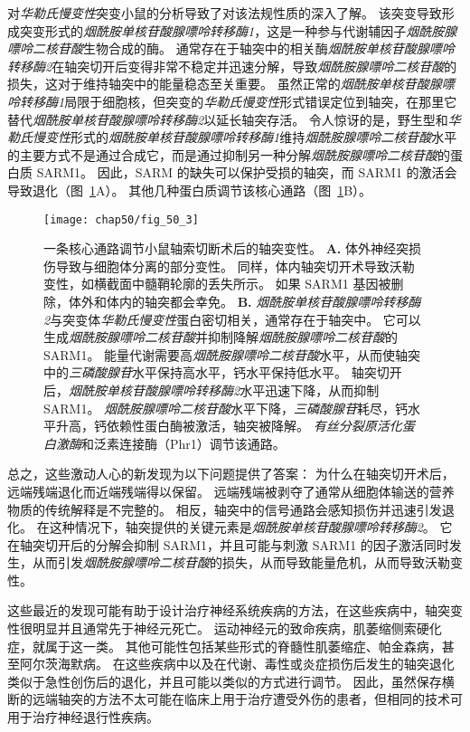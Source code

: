 对\textit{华勒氏慢变性}突变小鼠的分析导致了对该法规性质的深入了解。
该突变导致形成突变形式的\textit{烟酰胺单核苷酸腺嘌呤转移酶1}，这是一种参与代谢辅因子\textit{烟酰胺腺嘌呤二核苷酸}生物合成的酶。
通常存在于轴突中的相关酶\textit{烟酰胺单核苷酸腺嘌呤转移酶2}在轴突切开后变得非常不稳定并迅速分解，导致\textit{烟酰胺腺嘌呤二核苷酸}的损失，这对于维持轴突中的能量稳态至关重要。
虽然正常的\textit{烟酰胺单核苷酸腺嘌呤转移酶1}局限于细胞核，但突变的\textit{华勒氏慢变性}形式错误定位到轴突，在那里它替代\textit{烟酰胺单核苷酸腺嘌呤转移酶2}以延长轴突存活。
令人惊讶的是，野生型和\textit{华勒氏慢变性}形式的\textit{烟酰胺单核苷酸腺嘌呤转移酶1}维持\textit{烟酰胺腺嘌呤二核苷酸}水平的主要方式不是通过合成它，而是通过抑制另一种分解\textit{烟酰胺腺嘌呤二核苷酸}的蛋白质 SARM1。
因此，SARM 的缺失可以保护受损的轴突，而 SARM1 的激活会导致退化（图~\ref{fig:50_3}A）。
其他几种蛋白质调节该核心通路（图~\ref{fig:50_3}B）。


\begin{figure}[htbp]
	\centering
	\texttt{[image: chap50/fig\_50\_3]}
	\caption{一条核心通路调节小鼠轴索切断术后的轴突变性。
		\textbf{A.} 体外神经突损伤导致与细胞体分离的部分变性。
		同样，体内轴突切开术导致沃勒变性，如横截面中髓鞘轮廓的丢失所示。
		如果 SARM1 基因被删除，体外和体内的轴突都会幸免。
		\textbf{B.} \textit{烟酰胺单核苷酸腺嘌呤转移酶2}与突变体\textit{华勒氏慢变性}蛋白密切相关，通常存在于轴突中。
		它可以生成\textit{烟酰胺腺嘌呤二核苷酸}并抑制降解\textit{烟酰胺腺嘌呤二核苷酸}的 SARM1。
		能量代谢需要高\textit{烟酰胺腺嘌呤二核苷酸}水平，从而使轴突中的\textit{三磷酸腺苷}水平保持高水平，钙水平保持低水平。
		轴突切开后，\textit{烟酰胺单核苷酸腺嘌呤转移酶2}水平迅速下降，从而抑制 SARM1。
		\textit{烟酰胺腺嘌呤二核苷酸}水平下降，\textit{三磷酸腺苷}耗尽，钙水平升高，钙依赖性蛋白酶被激活，轴突被降解。
		\textit{有丝分裂原活化蛋白激酶}和泛素连接酶（Phr1）调节该通路。}
	\label{fig:50_3}
\end{figure}


总之，这些激动人心的新发现为以下问题提供了答案：
为什么在轴突切开术后，远端残端退化而近端残端得以保留。
远端残端被剥夺了通常从细胞体输送的营养物质的传统解释是不完整的。
相反，轴突中的信号通路会感知损伤并迅速引发退化。
在这种情况下，轴突提供的关键元素是\textit{烟酰胺单核苷酸腺嘌呤转移酶2}。
它在轴突切开后的分解会抑制 SARM1，并且可能与刺激 SARM1 的因子激活同时发生，从而引发\textit{烟酰胺腺嘌呤二核苷酸}的损失，从而导致能量危机，从而导致沃勒变性。


这些最近的发现可能有助于设计治疗神经系统疾病的方法，在这些疾病中，轴突变性很明显并且通常先于神经元死亡。
运动神经元的致命疾病，肌萎缩侧索硬化症，就属于这一类。
其他可能性包括某些形式的脊髓性肌萎缩症、帕金森病，甚至阿尔茨海默病。
在这些疾病中以及在代谢、毒性或炎症损伤后发生的轴突退化类似于急性创伤后的退化，并且可能以类似的方式进行调节。
因此，虽然保存横断的远端轴突的方法不太可能在临床上用于治疗遭受外伤的患者，但相同的技术可用于治疗神经退行性疾病。



